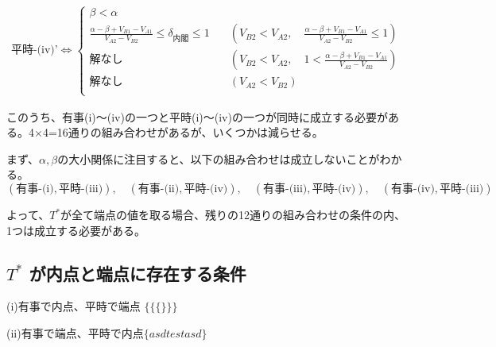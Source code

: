 \documentclass[main.tex]{subfiles}
\begin{document}
\begin{align*}
    \text{平時-(iv)'} \Leftrightarrow 
    \begin{cases}
        \beta < \alpha \\[1em]
        \frac{\alpha-\beta + V_{B1}-V_{A1}}{V_{A2} - V_{B2}} \le \delta_{内閣} \le 1  \quad &( V_{B2} < V_{A2} ,\quad \frac{\alpha-\beta + V_{B1}-V_{A1}}{V_{A2} - V_{B2}} \le 1) \\[1em]
        解なし  \quad &( V_{B2} < V_{A2} ,\quad 1 < \frac{\alpha-\beta + V_{B1}-V_{A1}}{V_{A2} - V_{B2}}) \\[1em]
        解なし \quad &( V_{A2} < V_{B2} )\\[1em]
    \end{cases}
\end{align*}


このうち、有事(i)〜(iv)の一つと平時(i)〜(iv)の一つが同時に成立する必要がある。4×4=16通りの組み合わせがあるが、いくつかは減らせる。

まず、$\alpha, \beta$の大小関係に注目すると、以下の組み合わせは成立しないことがわかる。
$$(\text{有事-(i)}, \text{平時-(iii)}),\quad (\text{有事-(ii)}, \text{平時-(iv)}),\quad (\text{有事-(iii)}, \text{平時-(iv)}),\quad (\text{有事-(iv)}, \text{平時-(iii)})$$

よって、$T^*$が全て端点の値を取る場合、残りの12通りの組み合わせの条件の内、1つは成立する必要がある。





\subsection{$T^*$ が内点と端点に存在する条件}

(i)有事で内点、平時で端点 $\Big\{  \big\{ \{\} \big\} \Big\} $

(ii)有事で端点、平時で内点$\lbrace asd   test asd \rbrace$


\theendnotes %
\end{document}
